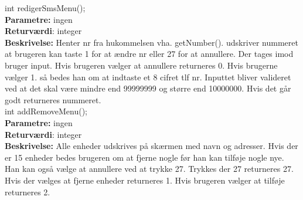 int redigerSmsMenu(); \\
\textbf{Parametre:} ingen \\
\textbf{Returværdi}: integer \\
\textbf{Beskrivelse:} Henter nr fra hukommelsen vha. getNumber(). udskriver nummeret at brugeren kan taste 1 for at ændre nr eller 27 for at annullere. Der tages imod bruger input. Hvis brugeren vælger at annullere returneres 0. Hvis brugerne vælger 1. så bedes han om at indtaste et 8 cifret tlf nr. Inputtet bliver valideret ved at det skal være mindre end 99999999 og større end 10000000. Hvis det går godt returneres nummeret. \\

int addRemoveMenu(); \\
\textbf{Parametre:} ingen \\
\textbf{Returværdi}: integer \\
\textbf{Beskrivelse:} Alle enheder udskrives på skærmen med navn og adresser. Hvis der er 15 enheder bedes brugeren om at fjerne nogle før han kan tilføje nogle nye. Han kan også vælge at annullere ved at trykke 27. Trykkes der 27 returneres 27. Hvis der vælges at fjerne enheder returneres 1. Hvis brugeren vælger at tilføje returneres 2. \\




